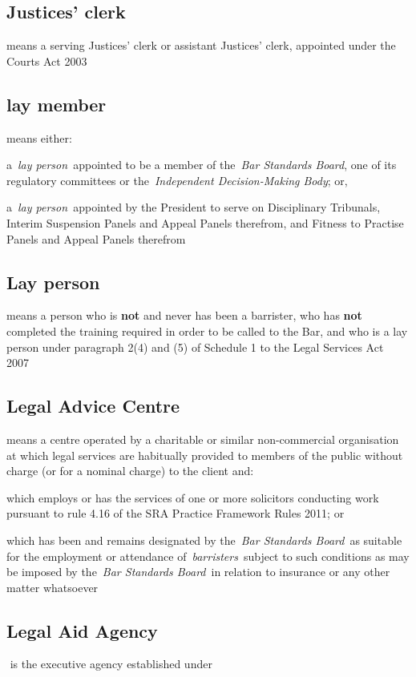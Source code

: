    \subsection{Justices' clerk } means a serving Justices' clerk or
  assistant Justices' clerk, appointed under the Courts Act 2003   \subsection{lay member } means either: \al \item a~\emph{lay person~}appointed
  to be a member of the~\emph{Bar Standards Board}, one of its
  regulatory committees or the~\emph{Independent Decision-Making Body};
  or,
  \item a~\emph{lay person~}appointed by the President to serve on
  Disciplinary Tribunals, Interim Suspension Panels and Appeal Panels
  therefrom, and Fitness to Practise Panels and Appeal Panels
  therefrom\la  \subsection{Lay person } means a person who is \textbf{not} and never has been a
  barrister, who has \textbf{not} completed the training required in order to be
  called to the Bar, and who is a lay person under paragraph 2(4) and
  (5) of Schedule 1 to the Legal Services Act 2007  \subsection{Legal Advice Centre } means a centre operated by a charitable
  or similar non-commercial organisation at which legal services are
  habitually provided to members of the public without charge (or for a
  nominal charge) to the client and:
  \al \item which employs or has the
  services of one or more solicitors conducting work pursuant to rule
  4.16 of the SRA Practice Framework Rules 2011; or
  \item  which has been
  and remains designated by the~\emph{Bar Standards Board}~as suitable
  for the employment or attendance of~\emph{barristers}~subject to such
  conditions as may be imposed by the~\emph{Bar Standards Board}~in
  relation to insurance or any other matter whatsoever \la  \subsection{Legal Aid Agency } is the executive agency established under
